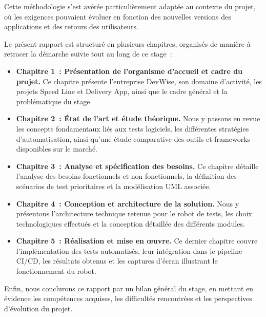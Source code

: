 Cette m\'{e}thodologie s'est av\'{e}r\'{e}e particuli\`{e}rement adapt\'{e}e au contexte du
projet, o\`{u} les exigences pouvaient \'{e}voluer en fonction des nouvelles
versions des applications et des retours des utilisateurs.

\vspace{0.3cm}


Le pr\'{e}sent rapport est structur\'{e} en plusieurs chapitres, organis\'{e}s de
mani\`{e}re \`{a} retracer la d\'{e}marche suivie tout au long de ce stage~:

\begin{itemize}
  \item \textbf{Chapitre 1~: Pr\'{e}sentation de l'organisme d'accueil et
    cadre du projet.} Ce chapitre pr\'{e}sente l'entreprise DevWise, son
    domaine d'activit\'{e}, les projets Speed Line et Delivery App, ainsi
    que le cadre g\'{e}n\'{e}ral et la probl\'{e}matique du stage.

  \item \textbf{Chapitre 2~: \'{E}tat de l'art et \'{e}tude th\'{e}orique.} Nous y
    passons en revue les concepts fondamentaux li\'{e}s aux tests logiciels,
    les diff\'{e}rentes strat\'{e}gies d'automatisation, ainsi qu'une \'{e}tude
    comparative des outils et frameworks disponibles sur le march\'{e}.

  \item \textbf{Chapitre 3~: Analyse et sp\'{e}cification des besoins.} Ce
    chapitre d\'{e}taille l'analyse des besoins fonctionnels et non
    fonctionnels, la d\'{e}finition des sc\'{e}narios de test prioritaires et
    la mod\'{e}lisation UML associ\'{e}e.

  \item \textbf{Chapitre 4~: Conception et architecture de la solution.}
    Nous y pr\'{e}sentons l'architecture technique retenue pour le robot de
    tests, les choix technologiques effectu\'{e}s et la conception d\'{e}taill\'{e}e
    des diff\'{e}rents modules.

  \item \textbf{Chapitre 5~: R\'{e}alisation et mise en \oe uvre.} Ce dernier
    chapitre couvre l'impl\'{e}mentation des tests automatis\'{e}s, leur
    int\'{e}gration dans le pipeline CI/CD, les r\'{e}sultats obtenus et les
    captures d'\'{e}cran illustrant le fonctionnement du robot.
\end{itemize}

\vspace{0.3cm}

Enfin, nous conclurons ce rapport par un bilan g\'{e}n\'{e}ral du stage, en
mettant en \'{e}vidence les comp\'{e}tences acquises, les difficult\'{e}s
rencontr\'{e}es et les perspectives d'\'{e}volution du projet.

\newpage
